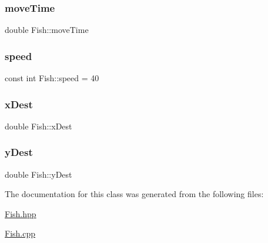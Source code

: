 \mbox{\label{class_fish_a44bb72a7856095a8fc17f59b45602bad}} 
\subsubsection{\texorpdfstring{move\+Time}{moveTime}}
{\footnotesize\ttfamily double Fish\+::move\+Time\hspace{0.3cm}{\ttfamily [protected]}}

\mbox{\label{class_fish_a2f84c2eeb84451bc55156ae9da753cc9}} 
\subsubsection{\texorpdfstring{speed}{speed}}
{\footnotesize\ttfamily const int Fish\+::speed = 40\hspace{0.3cm}{\ttfamily [protected]}}

\mbox{\label{class_fish_a8016badef0a39101994d62825dc69504}} 
\subsubsection{\texorpdfstring{x\+Dest}{xDest}}
{\footnotesize\ttfamily double Fish\+::x\+Dest\hspace{0.3cm}{\ttfamily [protected]}}

\mbox{\label{class_fish_a27b5905734d7d9f8f3a87fca6fbe2018}} 
\subsubsection{\texorpdfstring{y\+Dest}{yDest}}
{\footnotesize\ttfamily double Fish\+::y\+Dest\hspace{0.3cm}{\ttfamily [protected]}}



The documentation for this class was generated from the following files\+:\begin{DoxyCompactItemize}
\item 
\mbox{\hyperlink{_fish_8hpp}{Fish.\+hpp}}\item 
\mbox{\hyperlink{_fish_8cpp}{Fish.\+cpp}}\end{DoxyCompactItemize}

